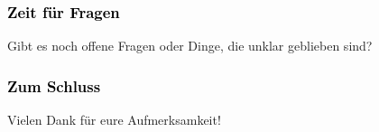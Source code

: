 \documentclass[xcolor=dvipsnames]{beamer}
\begin{document}

\begin{frame}[plain]
\frametitle{\textcolor{black}{Zeit für Fragen}}
Gibt es noch offene Fragen oder Dinge, die unklar geblieben sind?
\end{frame}

\begin{frame}[plain]
\frametitle{\textcolor{black}{Zum Schluss}}
Vielen Dank für eure Aufmerksamkeit!
\end{frame}

\end{document}
